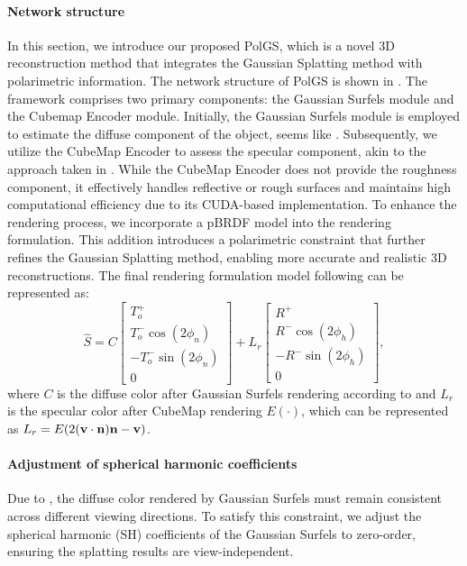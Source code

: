 \paragraph{Network structure}
In this section, we introduce our proposed PolGS, which is a novel 3D reconstruction method that integrates
the Gaussian Splatting method with polarimetric information. The network structure of PolGS is shown in .
The framework comprises two primary components: the Gaussian Surfels module and the Cubemap Encoder module. 
Initially, the Gaussian Surfels module is employed to estimate the diffuse component of the object, 
seems like \gs. Subsequently, we utilize the CubeMap Encoder 
to assess the specular component, akin to the approach taken in \dr. While the CubeMap Encoder does not provide the roughness component, it effectively handles reflective or rough surfaces and maintains high computational efficiency due to its CUDA-based implementation. 
To enhance the rendering process, we incorporate a pBRDF model into the rendering formulation. 
This addition introduces a polarimetric constraint that further refines the Gaussian Splatting method, 
enabling more accurate and realistic 3D reconstructions.
The final rendering formulation model following 
can be represented as:
\begin{equation}
    \hat{S} = C \begin{bmatrix}
        T_o^+ \\
        T_o^- \cos(2 \phi_n) \\
        - T_o^- \sin(2 \phi_n) \\
        0
    \end{bmatrix}+ L_r\begin{bmatrix}
        R^+ \\
        R^- \cos(2 \phi_h) \\
        -R^- \sin(2 \phi_h) \\
        0
    \end{bmatrix},
\label{eq:final_stokes}
\end{equation}
where $C$ is the diffuse color after Gaussian Surfels rendering according to  and 
$L_r$ is the specular color after CubeMap rendering $E(\cdot)$, which can be represented as 
$L_r = E(2(\mathbf{v}\cdot \textbf{n})\textbf{n}-\mathbf{v})$.
\vspace{-1em}
\paragraph{Adjustment of spherical harmonic coefficients}
Due to , the diffuse color rendered by Gaussian Surfels must remain consistent across different viewing directions. To satisfy this constraint, we adjust the spherical harmonic (SH) coefficients of the Gaussian Surfels to zero-order, ensuring the splatting results are view-independent.

